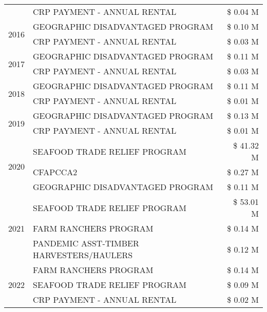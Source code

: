 \begin{tabular}{llr}
 & CRP PAYMENT - ANNUAL RENTAL & \$ 0.04 M \\
\cline{1-3}
\multirow[t]{2}{*}{2016} & GEOGRAPHIC DISADVANTAGED PROGRAM & \$ 0.10 M \\
 & CRP PAYMENT - ANNUAL RENTAL & \$ 0.03 M \\
\cline{1-3}
\multirow[t]{2}{*}{2017} & GEOGRAPHIC DISADVANTAGED PROGRAM & \$ 0.11 M \\
 & CRP PAYMENT - ANNUAL RENTAL & \$ 0.03 M \\
\cline{1-3}
\multirow[t]{2}{*}{2018} & GEOGRAPHIC DISADVANTAGED PROGRAM & \$ 0.11 M \\
 & CRP PAYMENT - ANNUAL RENTAL & \$ 0.01 M \\
\cline{1-3}
\multirow[t]{2}{*}{2019} & GEOGRAPHIC DISADVANTAGED PROGRAM & \$ 0.13 M \\
 & CRP PAYMENT - ANNUAL RENTAL & \$ 0.01 M \\
\cline{1-3}
\multirow[t]{3}{*}{2020} & SEAFOOD TRADE RELIEF PROGRAM & \$ 41.32 M \\
 & CFAPCCA2 & \$ 0.27 M \\
 & GEOGRAPHIC DISADVANTAGED PROGRAM & \$ 0.11 M \\
\cline{1-3}
\multirow[t]{3}{*}{2021} & SEAFOOD TRADE RELIEF PROGRAM & \$ 53.01 M \\
 & FARM RANCHERS PROGRAM & \$ 0.14 M \\
 & PANDEMIC ASST-TIMBER HARVESTERS/HAULERS & \$ 0.12 M \\
\cline{1-3}
\multirow[t]{3}{*}{2022} & FARM RANCHERS PROGRAM & \$ 0.14 M \\
 & SEAFOOD TRADE RELIEF PROGRAM & \$ 0.09 M \\
 & CRP PAYMENT - ANNUAL RENTAL & \$ 0.02 M \\
\cline{1-3}
\bottomrule
\end{tabular}
